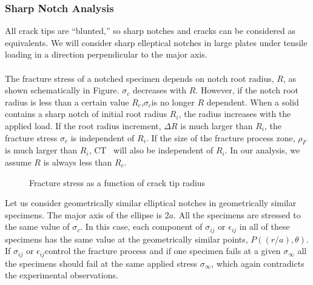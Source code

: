 \documentclass[12pt]{article}
\begin{document}
\subsubsection{Sharp Notch Analysis}
All crack tips are “blunted,” so sharp notches and cracks can be considered as equivalents. We will
consider sharp elleptical notches in large plates under tensile loading in a direction perpendicular to the
major axis.\\\\
The fracture stress of a notched specimen depends on notch root radius, $R$, as shown schematically
in Figure. $\sigma_c$ decreases with $R$. However, if the notch root radius is less than a certain value $R_c$,$\sigma_c$is no
longer $R$ dependent. When a solid contains a sharp notch of initial root radius $R_i$, the radius increases
with the applied load. If the root radius increment, $\Delta R$ is much larger than $R_i$, the fracture stress $\sigma_c$ is
independent of $R_i$. If the size of the fracture process zone, $\rho_F$ is much larger than $R_i$, CT~ will also be
independent of $R_i$. In our analysis, we assume $R$ is always less than $R_c$.

\begin{figure}[H]
    \centering
    \captionsetup{labelformat=empty}
    \caption{Fracture stress as a function of crack tip radius}
\end{figure}

Let us consider geometrically similar elliptical notches in geometrically similar specimens. The major
axis of the ellipse is 2$a$. All the specimens are stressed to the same value of $\sigma_c$. In this case, each
component of $\sigma_{ij}$ or $\epsilon_{ij}$ in all of these specimens has the same value at the geometrically similar points,
$P((r/a), \theta)$. If $\sigma_{ij}$ or $\epsilon_{ij} $control the fracture process and if one specimen fails at a given $\sigma_\infty$ all the
specimens should fail at the same applied stress $\sigma_\infty$, which again contradicts the experimental observations.
\end{document}
